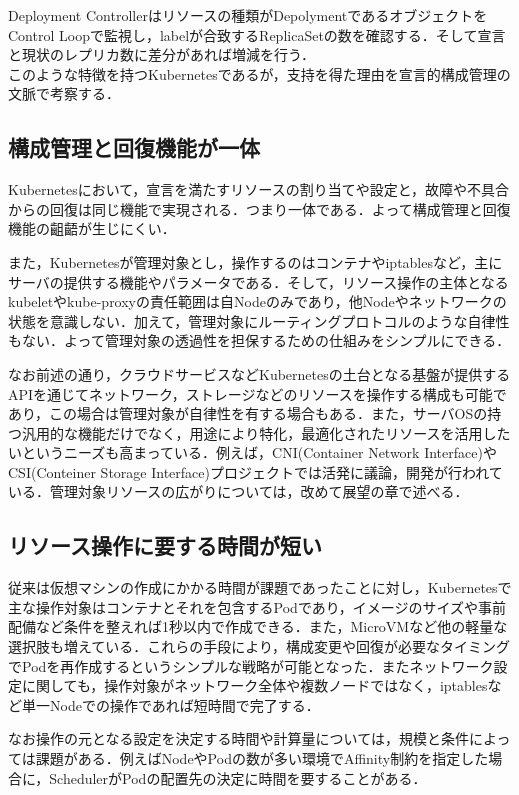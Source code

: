 \documentclass[12pt,a4j]{ujreport}
\begin{document}
Deployment Controllerはリソースの種類がDepolymentであるオブジェクトをControl Loopで監視し，labelが合致するReplicaSetの数を確認する．そして宣言と現状のレプリカ数に差分があれば増減を行う．\\

このような特徴を持つKubernetesであるが，支持を得た理由を宣言的構成管理の文脈で考察する．

\subsection{構成管理と回復機能が一体}
Kubernetesにおいて，宣言を満たすリソースの割り当てや設定と，故障や不具合からの回復は同じ機能で実現される．つまり一体である．よって構成管理と回復機能の齟齬が生じにくい．

また，Kubernetesが管理対象とし，操作するのはコンテナやiptablesなど，主にサーバの提供する機能やパラメータである．そして，リソース操作の主体となるkubeletやkube-proxyの責任範囲は自Nodeのみであり，他Nodeやネットワークの状態を意識しない．加えて，管理対象にルーティングプロトコルのような自律性もない．よって管理対象の透過性を担保するための仕組みをシンプルにできる．

なお前述の通り，クラウドサービスなどKubernetesの土台となる基盤が提供するAPIを通じてネットワーク，ストレージなどのリソースを操作する構成も可能であり，この場合は管理対象が自律性を有する場合もある．また，サーバOSの持つ汎用的な機能だけでなく，用途により特化，最適化されたリソースを活用したいというニーズも高まっている．例えば，CNI(Container Network Interface)\cite{ref18}やCSI(Conteiner Storage Interface)\cite{ref19}プロジェクトでは活発に議論，開発が行われている．管理対象リソースの広がりについては，改めて展望の章で述べる．

\subsection{リソース操作に要する時間が短い}
従来は仮想マシンの作成にかかる時間が課題であったことに対し，Kubernetesで主な操作対象はコンテナとそれを包含するPodであり，イメージのサイズや事前配備など条件を整えれば1秒以内で作成できる\cite{ref20}．また，MicroVMなど他の軽量な選択肢も増えている\cite{ref21}．これらの手段により，構成変更や回復が必要なタイミングでPodを再作成するというシンプルな戦略が可能となった．またネットワーク設定に関しても，操作対象がネットワーク全体や複数ノードではなく，iptablesなど単一Nodeでの操作であれば短時間で完了する．

なお操作の元となる設定を決定する時間や計算量については，規模と条件によっては課題がある．例えばNodeやPodの数が多い環境でAffinity制約を指定した場合に，SchedulerがPodの配置先の決定に時間を要することがある\cite{ref22}．
\end{document}
